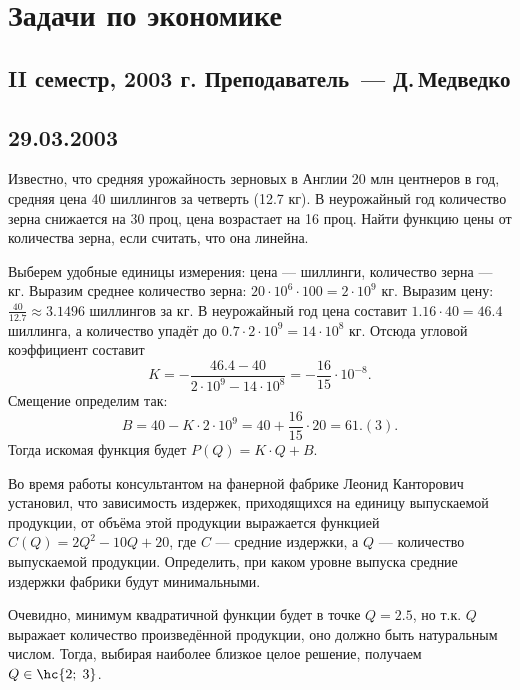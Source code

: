\documentclass[a4paper]{article}
\begin{document}
\section*{Задачи по экономике}

\subsection*{II семестр, 2003 г. Преподаватель~--- Д.\,Медведко}

\subsection*{29.03.2003}

\begin{problem}
Известно, что средняя урожайность зерновых в Англии
20 млн центнеров в год, средняя цена 40 шиллингов за четверть
(12.7 кг). В неурожайный год количество зерна
снижается на 30 проц, цена возрастает на 16 проц. Найти функцию
цены от количества зерна, если считать, что она линейна.
\end{problem}
\begin{solution}
Выберем удобные единицы измерения: цена --- шиллинги,
количество зерна --- кг. Выразим среднее количество зерна:
$20 \cdot 10^6 \cdot 100 = 2 \cdot 10^9$ кг. Выразим цену:
$\frac{40}{12.7} \approx 3.1496$ шиллингов за кг. В неурожайный год
цена составит $1.16 \cdot 40=46.4$ шиллинга, а количество упадёт
до $0.7 \cdot 2 \cdot 10^9 = 14 \cdot 10^8$ кг. Отсюда угловой коэффициент
составит $$K=-\frac{46.4-40}{2\cdot 10^9-14 \cdot 10^8} = -\frac{16}{15}\cdot 10^{-8}.$$
Смещение определим так:
$$B=40 - K\cdot 2 \cdot 10^9=40+\frac{16}{15}\cdot 20 = 61.(3).$$
Тогда искомая функция будет $P(Q)=K\cdot Q+B$.
\end{solution}

\begin{problem}
Во время работы консультантом на фанерной фабрике Леонид Канторович
установил, что зависимость издержек, приходящихся на единицу выпускаемой
продукции, от объёма этой продукции выражается функцией $C(Q) = 2Q^2 - 10Q + 20$,
где $C$ --- средние издержки, а $Q$ --- количество выпускаемой продукции.
Определить, при каком уровне выпуска средние издержки фабрики будут минимальными.
\end{problem}
\begin{solution}
Очевидно, минимум квадратичной функции будет в точке $Q=2.5$, но т.к. $Q$ выражает
количество произведённой продукции, оно должно быть натуральным числом. Тогда, выбирая
наиболее близкое целое решение, получаем $Q \in \hc{2;\;3}$.
\end{solution}
\end{document}
